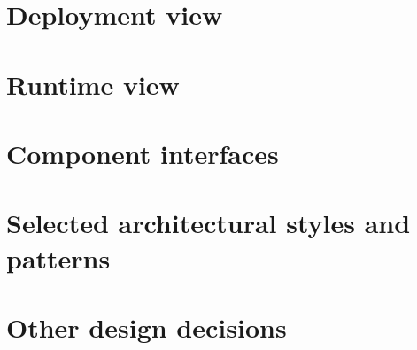 \section{Deployment view}

\section{Runtime view}

\section{Component interfaces}

\section{Selected architectural styles and patterns}

\section{Other design decisions}
